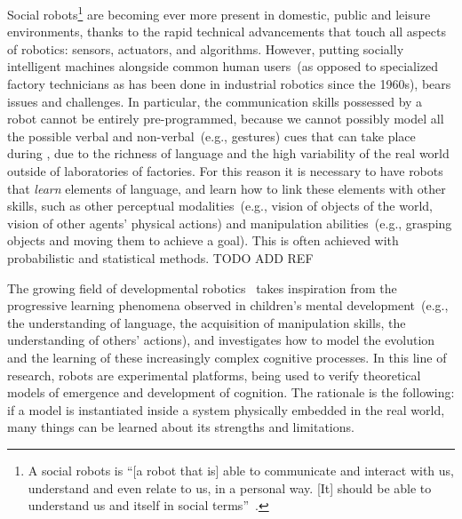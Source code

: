 Social robots\footnote{A social robots is ``[a robot that is] able to communicate and interact with us, understand and even relate to us, in a personal way. [It] should be able to understand us and itself in social terms''~\cite{breazeal:2002:dsr}.} are becoming ever more present in domestic, public and leisure environments, thanks to the rapid technical advancements that touch all aspects of robotics: sensors, actuators, and algorithms.
However, putting socially intelligent machines alongside common human users~(as opposed to specialized factory technicians as has been done in industrial robotics since the 1960s), bears issues and challenges.
In particular, the communication skills possessed by a robot cannot be entirely pre-programmed, because we cannot possibly model all the possible verbal and non-verbal~(e.g., gestures) cues that can take place during \hri, due to the richness of language and the high variability of the real world outside of laboratories of factories.
For this reason it is necessary to have robots that \emph{learn} elements of language, and learn how to link these elements with other skills, such as other perceptual modalities~(e.g., vision of objects of the world, vision of other agents' physical actions) and manipulation abilities~(e.g., grasping objects and moving them to achieve a goal).
This is often achieved with probabilistic and statistical methods. TODO ADD REF

The growing field of developmental robotics~\cite{lungarella:2003:devrobsurvey,cangelosi:2015:devrobbook} takes inspiration from the progressive learning phenomena observed in children's mental development~(e.g., the understanding of language, the acquisition of manipulation skills, the understanding of others' actions), and investigates how to model the evolution and the learning of these increasingly complex cognitive processes.
In this line of research, robots are experimental platforms, being used to verify theoretical models of emergence and development of cognition.
The rationale is the following: if a model is instantiated inside a system physically embedded in the real world, many things can be learned about its strengths and limitations.

